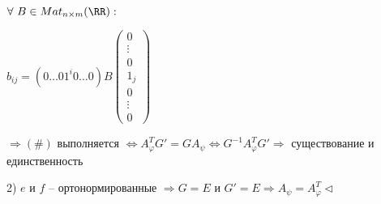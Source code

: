 $\forall \ B \in Mat_{n \times m} (\RR):$

$b_{ij} = (0 \dots 01^i0 \dots 0) B \begin{pmatrix} 0 \\ \vdots \\ 0 \\ 1_j \\ 0 \\ \vdots \\ 0 \end{pmatrix}$

$\Rightarrow (\#)$ выполняется $\Leftrightarrow A_{\varphi}^T G' = G A_{\psi} \Leftrightarrow G^{-1} A_{\varphi}^T G' \Rightarrow$ существование и единственность

2) $e$ и $f$ -- ортонормированные $\Rightarrow G = E$ и $G' = E \Rightarrow A_{\psi} = A_{\varphi}^T \lhd$


